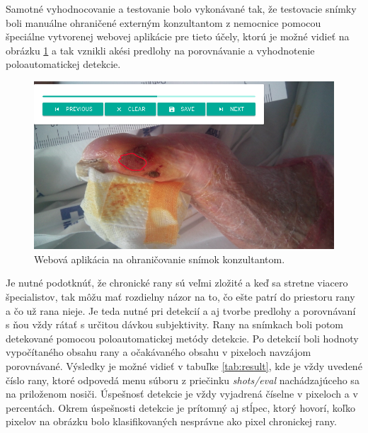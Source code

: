 Samotné vyhodnocovanie a testovanie bolo vykonávané tak, že testovacie snímky boli manuálne ohraničené externým konzultantom z nemocnice pomocou špeciálne vytvorenej webovej aplikácie pre tieto účely, ktorú je možné vidieť na obrázku \ref{fig:anotator} a tak vznikli akési predlohy na porovnávanie a vyhodnotenie poloautomatickej detekcie. 
\begin{figure}[h]
  \centering
  \includegraphics[scale=0.5]{fig/anotator.png}
  \caption{Webová aplikácia na ohraničovanie snímok konzultantom.}
  \label{fig:anotator}
\end{figure}
Je nutné podotknúť, že chronické rany sú veľmi zložité a keď sa stretne viacero špecialistov, tak môžu mať rozdielny názor na to, čo ešte patrí do priestoru rany a čo už rana nieje. Je teda nutné pri detekcií a aj tvorbe predlohy a porovnávaní s ňou vždy rátať s určitou dávkou subjektivity. Rany na snímkach boli potom detekované pomocou poloautomatickej metódy detekcie. Po detekcií boli hodnoty vypočítaného obsahu rany a očakávaného obsahu v pixeloch navzájom porovnávané. Výsledky je možné vidieť v tabuľke \ref{tab:result}, kde je vždy uvedené číslo rany, ktoré odpovedá menu súboru z priečinku \textit{shots/eval} nachádzajúceho sa na priloženom nosiči. Úspešnosť detekcie je vždy vyjadrená číselne v pixeloch a v percentách. Okrem úspešnosti detekcie je prítomný aj stĺpec, ktorý hovorí, koľko pixelov na obrázku bolo klasifikovaných nesprávne ako pixel chronickej rany. 
